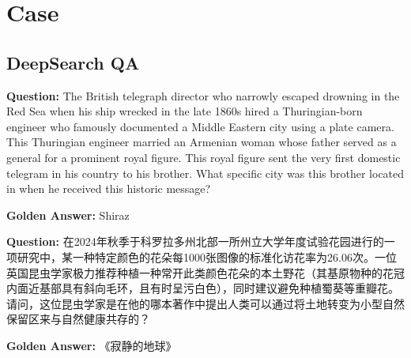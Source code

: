 \documentclass{huawei}
\begin{document}
\endgroup









\newpage
\appendix


\section{Case}

\subsection{DeepSearch QA}
\label{appendix:DeepSearch QA}
\begin{tcolorbox}[
    title={English Example (125-turn tool use with Qwen3.7-Max)},
    colback=gray!5,
    colframe=gray!40,
    fonttitle=\bfseries,
    boxrule=0.5pt,
    arc=2pt,
    breakable
]
\ttfamily
\textbf{Question:} The British telegraph director who narrowly escaped drowning in the Red Sea when his ship wrecked in the late 1860s hired a Thuringian-born engineer who famously documented a Middle Eastern city using a plate camera. This Thuringian engineer married an Armenian woman whose father served as a general for a prominent royal figure. This royal figure sent the very first domestic telegram in his country to his brother. What specific city was this brother located in when he received this historic message?

\textbf{Golden Answer:} Shiraz 
\end{tcolorbox}

\begin{tcolorbox}[
    title={Chinese Example (104-turn tool use with Qwen3.7-Max)},
    colback=gray!5,
    colframe=gray!40,
    fonttitle=\bfseries,
    boxrule=0.5pt,
    arc=2pt,
    breakable
]
\ttfamily
\textbf{Question:} 在2024年秋季于科罗拉多州北部一所州立大学年度试验花园进行的一项研究中，某一种特定颜色的花朵每1000张图像的标准化访花率为26.06次。一位英国昆虫学家极力推荐种植一种常开此类颜色花朵的本土野花（其基原物种的花冠内面近基部具有斜向毛环，且有时呈污白色），同时建议避免种植蜀葵等重瓣花。请问，这位昆虫学家是在他的哪本著作中提出人类可以通过将土地转变为小型自然保留区来与自然健康共存的？


\textbf{Golden Answer:} 《寂静的地球》
\end{tcolorbox}
\end{document}

